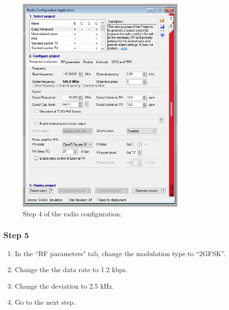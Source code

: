 \begin{figure}[!h]
	\begin{center}
		\includegraphics[width=0.75\textwidth]{figures/wds-tutorial/wds-tutorial-4.png}
		\caption{Step 4 of the radio configuration.}
		\label{fig:wds-tutorial-step-4}
	\end{center}
\end{figure}

\subsubsection{Step 5}

\begin{enumerate}
    \item In the ``RF parameters" tab, change the modulation type to ``2GFSK''.
    \item Change the the data rate to 1.2 kbps.
    \item Change the deviation to 2.5 kHz.
    \item Go to the next step.
\end{enumerate}


